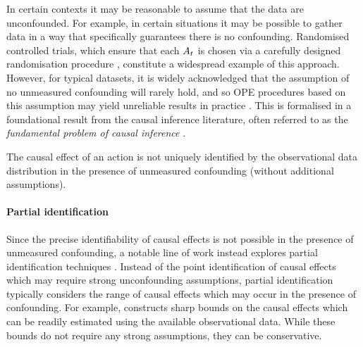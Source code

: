 In certain contexts it may be reasonable to assume that the data are unconfounded. For example, in certain situations it may be possible to gather data in a way that specifically guarantees there is no confounding.
Randomised controlled trials, which ensure that each $A_t$ is chosen via a carefully designed randomisation procedure \citep{lavori2004dynamic,murphy2005experimental}, constitute a widespread example of this approach. However, for typical datasets, it is widely acknowledged that the assumption of no unmeasured confounding will rarely hold, and so OPE procedures based on this assumption may yield unreliable results in practice \citep{murphy2003optimal,tsiatis2019dynamic}. 
This is formalised in a foundational result from the causal inference literature, often referred to as the \emph{fundamental problem of causal inference} \citep{holland1986statistics}.
\begin{mainresultwithtitle}[title=Fundamental problem of causal inference (informal statement)]\noindent
    The causal effect of an action is not uniquely identified by the observational data distribution in the presence of unmeasured confounding (without additional assumptions).
\end{mainresultwithtitle}


\paragraph{Partial identification}
Since the precise identifiability of causal effects is not possible in the presence of unmeasured confounding, a notable line of work instead explores partial identification techniques \citep{manski,manski1989anatomy, manski2003partial}. Instead of the point identification of causal effects which may require strong unconfounding assumptions, partial identification typically considers the range of causal effects which may occur in the presence of confounding. For example, \cite{manski} constructs sharp bounds on the causal effects which can be readily estimated using the available observational data. While these bounds do not require any strong assumptions, they can be conservative. 

